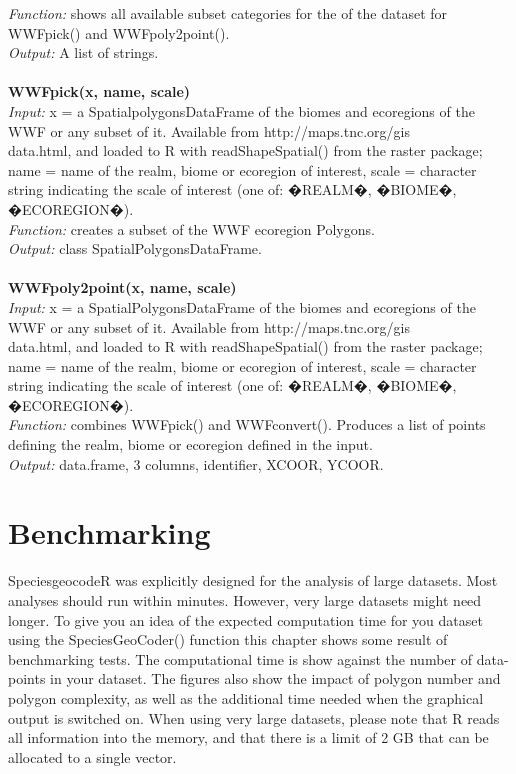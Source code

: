\documentclass[a4paper,titlepage,11pt]{scrreprt}
\begin{document}
\textit{Function:} shows all available subset categories for the of the dataset for WWFpick() and WWFpoly2point().\\
\textit{Output:} A list of strings.\\
\\
\textbf{WWFpick(x, name, scale)}\\
\textit{Input:} x = a SpatialpolygonsDataFrame of the biomes and ecoregions of the WWF or any subset of it. Available from http://maps.tnc.org/gis\\data.html, and loaded to R with readShapeSpatial() from the raster package; name = name of the realm, biome or ecoregion of interest, scale = character string indicating the scale of interest (one of: �REALM�, �BIOME�, �ECOREGION�).\\
\textit{Function:} creates a subset of the WWF ecoregion Polygons.\\
\textit{Output:} class SpatialPolygonsDataFrame.\\
\\
\textbf{WWFpoly2point(x, name, scale)}\\
\textit{Input:} x = a SpatialPolygonsDataFrame of the biomes and ecoregions of the WWF or any subset of it. Available from http://maps.tnc.org/gis\\data.html, and loaded to R with readShapeSpatial() from the raster package; name = name of the realm, biome or ecoregion of interest, scale = character string indicating the scale of interest (one of: �REALM�, �BIOME�, �ECOREGION�).\\
\textit{Function:} combines WWFpick() and WWFconvert(). Produces a list of points defining the realm, biome or ecoregion defined in the input.\\
\textit{Output:} data.frame, 3 columns, identifier, XCOOR, YCOOR.\\

\chapter{Benchmarking} \label{benchmark}
SpeciesgeocodeR was explicitly designed for the analysis of large datasets. Most analyses should run within minutes. However, very large datasets might need longer. To give you an idea of the expected computation time for you dataset using the SpeciesGeoCoder() function this chapter shows some result of benchmarking tests. The computational time is show against the number of data-points in your dataset. The figures also show the impact of polygon number and polygon complexity, as well as the additional time needed when the graphical output is switched on. When using very large datasets, please note that R reads all information into the memory, and that there is a limit of 2 GB that can be allocated to a single vector.
\newpage
\end{document}
